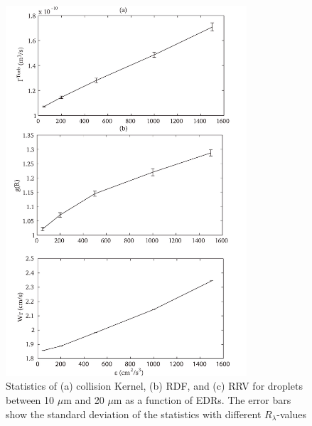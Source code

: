 \begin{figure}[ht]
\centering
\includegraphics[width=0.8\textwidth]{Figures/Chap2/diss_cs.jpg} 
\caption{ Statistics of (a) collision Kernel, (b) RDF, and (c) RRV for droplets between 10 $\mu$m and 20 $\mu$m as a function of EDRs. The error bars show the standard deviation of the statistics with different $R_\lambda$-values} \label{fig:diss_cs}
\end{figure}

